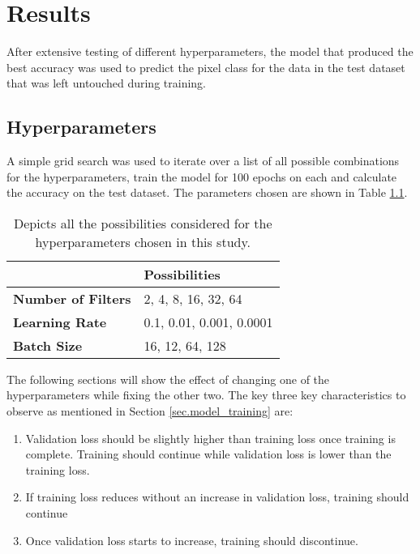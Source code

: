 \chapter{Results}
After extensive testing of different hyperparameters, the model that produced the best accuracy was used to predict the pixel class for the data in the test dataset that was left untouched during training. 
\section{Hyperparameters}
A simple grid search was used to iterate over a list of all possible combinations for the hyperparameters, train the model for 100 epochs on each and calculate the accuracy on the test dataset. The parameters chosen are shown in Table \ref{tab.grid_search}. 
\begin{table}[htbp]
\centering 
\begin{tabular}{l|l}
                           & \textbf{Possibilities}   \\ \hline
\textbf{Number of Filters} & 2, 4, 8, 16, 32, 64      \\ 
\textbf{Learning Rate}     & 0.1, 0.01, 0.001, 0.0001 \\ 
\textbf{Batch Size}        & 16, 12, 64, 128     \\ 
\end{tabular}
\caption[Hyperparameter possibilities]{Depicts all the possibilities considered for the hyperparameters chosen in this study.}
\label{tab.grid_search}
\end{table}
The following sections will show the effect of changing one of the hyperparameters while fixing the other two. The key three key characteristics to observe as mentioned in Section \ref{sec.model_training} are:
\begin{enumerate}
    \item Validation loss should be slightly higher than training loss once training is complete. Training should continue while validation loss is lower than the training loss.
    \item If training loss reduces without an increase in validation loss, training should continue
    \item Once validation loss starts to increase, training should discontinue. 
\end{enumerate}
